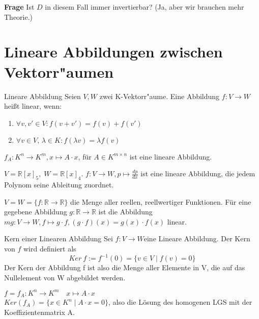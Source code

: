 \documentclass[oneside,fontsize=11pt,paper=a4,BCOR=0mm,DIV=12,automark,headsepline]{scrbook}
\theoremstyle{remark}
\theoremstyle{definition}
\theoremstyle{definition}
\theoremstyle{remark}
\begin{document}
\textbf{Frage} Ist \(D\) in diesem Fall immer invertierbar? (Ja, aber wir brauchen mehr Theorie.)

\chapter{Lineare Abbildungen zwischen Vektorr"aumen}
\label{sec:orgb4c03c4}
\begin{definition}{Lineare Abbildung}{}
  Seien \(V, W\) zwei K-Vektorr"aume. Eine Abbildung \(f: V\rightarrow W\) heißt linear, wenn:

  \begin{enumerate}
  \item \(\forall v,v' \in V: f(v+v')=f(v)+f(v')\)
  \item \(\forall v\in V,\,  \lambda \in K: f(\lambda v)=\lambda f(v)\)
  \end{enumerate}

\end{definition}

\begin{exa}
  $f_{A}: K^n\rightarrow K^m, x\mapsto A\cdot x$, für $A \in K^{m\times n}$ ist eine lineare Abbildung.
\end{exa}

\begin{exa}
  \(V=\mathbb{R}[x]_5,\;W=\mathbb{R}[x]_4\). $f: V\rightarrow W, p \mapsto \frac{dp}{dx}$ ist eine lineare Abbildung, die jedem Polynom seine Ableitung zuordnet.
\end{exa}

\begin{exa}
  $V=W=\{f:\mathbb{R}\rightarrow\mathbb{R}\}$ die Menge aller reellen, reellwertiger Funktionen. Für eine gegebene Abbildung $g:\mathbb{R}\rightarrow\mathbb{R}$ ist die Abbildung $mg: V\rightarrow W, f\mapsto g\cdot f, (g\cdot f)(x)=g(x)\cdot f(x)$ linear.
\end{exa}

\begin{definition}{Kern einer Linearen Abbildung}{}
  Sei $f:V\rightarrow W$eine Lineare Abbildung. Der Kern von \(f\) wird definiert als \[Ker\: f := f^{-1}(0) = \{v\in V \mid f(v)=0\}\] Der Kern der Abbildung f ist also die Menge aller Elemente in V, die auf das Nullelement von W abgebildet werden.
\end{definition}

\begin{exa}
  $f=f_A: K^n\rightarrow K^m \quad x\mapsto A\cdot x$\\
  $Ker (f_A) = \{x\in K^n\mid A\cdot x = 0\}$, also die Lösung des homogenen LGS mit der Koeffizientenmatrix A.
\end{exa}
\end{document}
